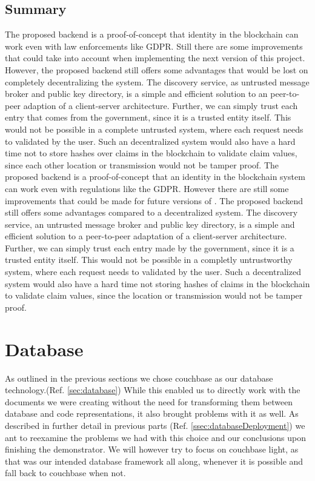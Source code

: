 \subsection{Summary}
The proposed backend is a proof-of-concept that identity in the blockchain can work even with law enforcements like GDPR.
Still there are some improvements that could take into account when implementing the next version of this project.
However, the proposed backend still offers some advantages that would be lost on completely decentralizing the system.
The discovery service, as untrusted message broker and public key directory,
is a simple and efficient solution to an peer-to-peer adaption of a client-server architecture.
Further, we can simply trust each entry that comes from the government, since it is a trusted entity itself.
This would not be possible in a complete untrusted system, where each request needs to validated by the user.
Such an decentralized system would also have a hard time not to store hashes over claims in the blockchain to validate
claim values, since each other location or transmission would not be tamper proof.
The proposed backend is a proof-of-concept that an identity in the blockchain system can work even with regulations like the GDPR. However there are still some improvements that could be made for future versions of \projectName{}. The proposed backend still offers some advantages compared to a decentralized system. The discovery service, an untrusted message broker and public key directory, is a simple and efficient solution to a peer-to-peer adaptation of a client-server architecture. Further, we can simply trust each entry made by the government, since it is a trusted entity itself. This would not be possible in a completly untrustworthy system, where each request needs to validated by the user. Such a decentralized system would also have a hard time not storing hashes of claims in the blockchain to validate claim values, since the location or transmission would not be tamper proof.

\section{Database}
\label{sec:databaseEval}
As outlined in the previous sections we chose couchbase as our database technology.(Ref. \ref{sec:database})
While this enabled us to directly work with the documents we were creating without the need for transforming them between
database and code representations, it also brought problems with it as well.
As described in further detail in previous parts (Ref. \ref{ssec:databaseDeployment}) we ant to reexamine the problems
we had with this choice and our conclusions upon finishing the demonstrator.
We will however try to focus on couchbase light, as that was our intended database framework all along, whenever it is
possible and fall back to couchbase when not.

